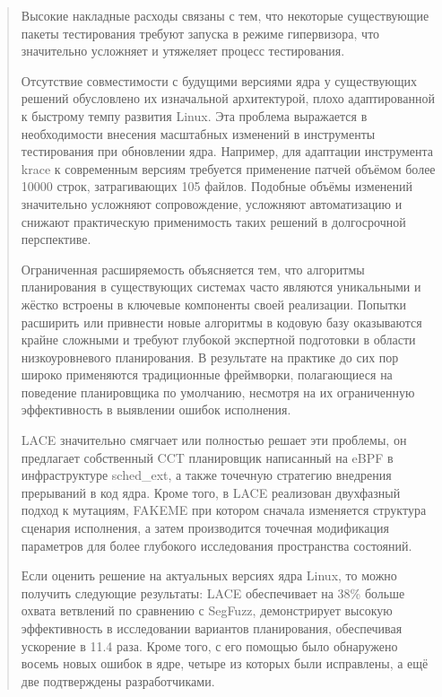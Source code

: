 \documentclass[12pt, oneside]{book}
\begin{document}
\begin{quote}
  Высокие накладные расходы связаны с тем, что некоторые
  существующие пакеты тестирования требуют запуска в режиме
  гипервизора, что значительно усложняет и утяжеляет процесс тестирования.
 
  Отсутствие совместимости с будущими версиями ядра у существующих решений
  обусловлено их изначальной архитектурой, плохо адаптированной к быстрому
  темпу развития Linux. Эта проблема выражается в необходимости внесения
  масштабных изменений в инструменты тестирования при обновлении ядра.
  Например, для адаптации инструмента krace к современным версиям требуется
  применение патчей объёмом более 10000 строк, затрагивающих 105 файлов.
  Подобные объёмы изменений значительно усложняют сопровождение, усложняют
  автоматизацию и снижают практическую применимость таких решений
  в долгосрочной перспективе.
  
  Ограниченная расширяемость объясняется тем, что алгоритмы
  планирования в существующих системах часто являются уникальными
  и жёстко встроены в ключевые компоненты своей реализации.
  Попытки расширить или привнести новые алгоритмы в кодовую базу
  оказываются крайне сложными и требуют глубокой экспертной подготовки
  в области низкоуровневого планирования. В результате на практике до
  сих пор широко применяются традиционные фреймворки, полагающиеся на
  поведение планировщика по умолчанию, несмотря на их ограниченную
  эффективность в выявлении ошибок исполнения.

  LACE значительно смягчает или полностью решает эти проблемы,
  он предлагает собственный CCT планировщик написанный на eBPF
  в инфраструктуре sched\_ext, а также точечную стратегию внедрения
  прерываний в код ядра. Кроме того, в LACE реализован двухфазный подход
  к мутациям, FAKEME при котором сначала изменяется структура сценария
  исполнения, а затем производится точечная модификация параметров для
  более глубокого исследования пространства состояний.
  
  Если оценить решение на актуальных версиях ядра Linux, то можно
  получить следующие результаты: LACE обеспечивает на 
  38\% больше охвата ветвлений по сравнению с SegFuzz,
  демонстрирует высокую эффективность в исследовании вариантов
  планирования, обеспечивая ускорение в 11.4 раза.
  Кроме того, с его помощью было обнаружено восемь новых ошибок в ядре,
  четыре из которых были исправлены, а ещё две подтверждены разработчиками.
\end{quote}
\end{document}

